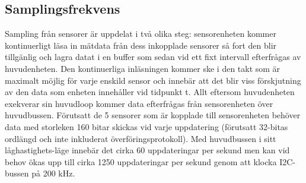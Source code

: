 \documentclass{article}
\begin{document}
\subsection{Samplingsfrekvens}
\label{sec:samplingsfrekvens}
Sampling från sensorer är uppdelat i två olika steg: sensorenheten kommer kontinuerligt läsa in mätdata från dess inkopplade sensorer så fort den blir tillgänlig och lagra datat i en buffer som sedan vid ett fixt intervall efterfrågas av huvudenheten. Den kontinuerliga inläsningen kommer ske i den takt som är maximalt möjlig för varje enskild sensor och innebär att det blir viss förskjutning av den data som enheten innehåller vid tidpunkt t. Allt eftersom huvudenheten exekverar sin huvudloop kommer data efterfrågas från sensorenheten över huvudbussen. Förutsatt de 5 sensorer som är kopplade till sensorenheten behöver data med storleken 160 bitar skickas vid varje uppdatering (förutsatt 32-bitas ordlängd och inte inkluderat överföringsprotokoll). Med huvudbussen i sitt låghastighets-läge innebär det cirka 60 uppdateringar per sekund men kan vid behov ökas upp till cirka 1250 uppdateringar per sekund genom att klocka I2C-bussen på 200 kHz.

\clearpage

\nocite{*}
{}

\end{document}

